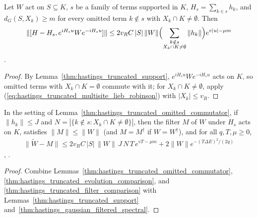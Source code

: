 \begin{lemma}
    \label{thm:hastings_truncated_omitted_commutator}
    \leanok
    Let $W$ act on $S\subseteq K$, $s$ be a family of terms supported in $K$,
    $H_s=\sum_{k\in s}h_k$, and $d_G(S,X_k)\ge m$ for every omitted term
    $k\notin s$ with $X_k\cap K\ne\emptyset$. Then
    \begin{align}
        \|[H-H_s,e^{iH_su}We^{-iH_su}]\|
        \le2v_RC\,|S|\,\|W\|\Bigl(\sum_{\substack{k\notin s \\ X_k\cap K\ne\emptyset}}\|h_k\|\Bigr)e^{v|u|-\mu m}
        \label{eq:hastings_truncated_omitted_commutator}
    \end{align}
    \cite[lines 1469--1505]{Hastings2006Solving}.
\end{lemma}
\begin{proof}
    \leanok
    By Lemma~\ref{thm:hastings_truncated_support}, $e^{iH_su}We^{-iH_su}$ acts
    on $K$, so omitted terms with $X_k\cap K=\emptyset$ commute with it; for
    $X_k\cap K\ne\emptyset$, apply
    (\ref{eq:hastings_truncated_multisite_lieb_robinson}) with $|X_k|\le v_R$.
\end{proof}

\begin{lemma}
    \label{thm:hastings_truncated_approximation}
    \leanok
    In the setting of Lemma~\ref{thm:hastings_truncated_omitted_commutator},
    if $\|h_k\|\le J$ and $N=|\{k\notin s:X_k\cap K\ne\emptyset\}|$, then the
    filter $M$ of $W$ under $H_s$ acts on $K$, satisfies $\|M\|\le\|W\|$ (and
    $M=M^\dagger$ if $W=W^\dagger$), and for all $q,T,\mu\ge0$,
    \begin{align}
        \|\widetilde W-M\|\le2v_RC\,|S|\,\|W\|\,J\,N\,T\,e^{vT-\mu m}
        +2\|W\|e^{-(T\Delta E)^2/(2q)}
        \label{eq:hastings_truncated_approximation}
    \end{align}
    \cite[eq.~(apb), lines 300--320]{Hastings2006Solving},
    \cite{gap:hastings05_truncated_dynamics}.
\end{lemma}
\begin{proof}
    \leanok
    Combine Lemmas~\ref{thm:hastings_truncated_omitted_commutator},
    \ref{thm:hastings_truncated_evolution_comparison}, and
    \ref{thm:hastings_truncated_filter_comparison} with
    Lemmas~\ref{thm:hastings_truncated_support}
    and~\ref{thm:hastings_gaussian_filtered_spectral}.
\end{proof}


